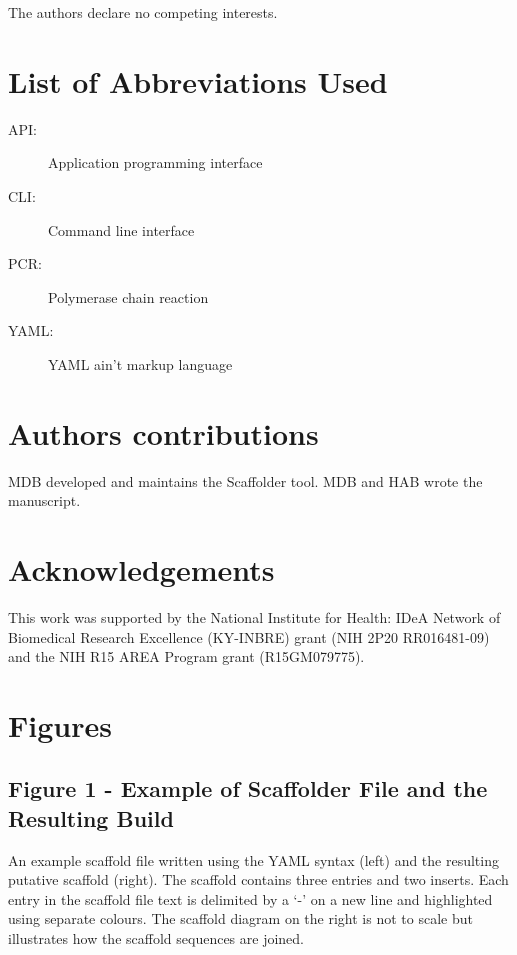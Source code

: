 \documentclass[10pt]{bmc_article}
\newenvironment{bmcformat}{\begin{raggedright}\baselineskip20pt\sloppy\setboolean{publ}{false}}{\end{raggedright}\baselineskip20pt\sloppy}
\begin{document}
\begin{bmcformat}
The authors declare no competing interests.

\section*{List of Abbreviations Used} %

  \begin{description}
    \item[API:] Application programming interface
    \item[CLI:] Command line interface
    \item[PCR:] Polymerase chain reaction
    \item[YAML:] YAML ain't markup language\cite{yaml}
  \end{description}

\section*{Authors contributions} %

MDB developed and maintains the Scaffolder tool. MDB and HAB wrote the
manuscript.

\section*{Acknowledgements} %

This work was supported by the National Institute for Health: IDeA Network of
Biomedical Research Excellence (KY-INBRE) grant (NIH 2P20 RR016481-09) and the
NIH R15 AREA Program grant (R15GM079775).

\clearpage

{
   }     %


\clearpage

\section*{Figures} %

\subsection*{Figure 1 - Example of Scaffolder File and the Resulting Build}

An example scaffold file written using the YAML syntax \cite{yaml} (left) and
the resulting putative scaffold (right). The scaffold contains three entries
and two inserts. Each entry in the scaffold file text is delimited by a `-' on
a new line and highlighted using separate colours. The scaffold diagram on the
right is not to scale but illustrates how the scaffold sequences are joined.
\pb

\end{bmcformat}
\end{document}
